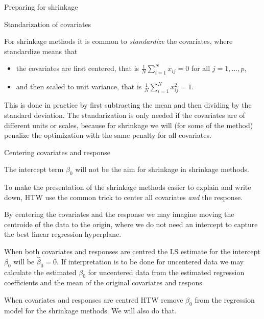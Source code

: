 \documentclass[
  ignorenonframetext,
]{beamer}
\providecommand{\tightlist}{%
  \setlength{\itemsep}{0pt}\setlength{\parskip}{0pt}}
\begin{document}
\begin{frame}

\begin{block}{Preparing for shrinkage}

\begin{block}{Standarization of covariates}

For shrinkage methods it is common to \emph{standardize} the covariates,
where standardize means that

\begin{itemize}
\tightlist
\item
  the covariates are first centered, that is
  \(\frac{1}{N}\sum_{i=1}^N x_{ij}=0\) for all \(j=1,\ldots, p\),
\item
  and then scaled to unit variance, that is
  \(\frac{1}{N}\sum_{i=1}^N x^2_{ij}=1\).
\end{itemize}

This is done in practice by first subtracting the mean and then dividing
by the standard deviation. The standarization is only needed if the
covariates are of different units or scales, because for shrinkage we
will (for some of the method) penalize the optimization with the same
penalty for all covariates.

\end{block}

\end{block}

\end{frame}

\begin{frame}

\begin{block}{Centering covariates and response}

The intercept term \(\beta_0\) will not be the aim for shrinkage in
shrinkage methods.

To make the presentation of the shrinkage methods easier to explain and
write down, HTW use the common trick to center all covariates \emph{and}
the response.

By centering the covariates and the response we may imagine moving the
centroide of the data to the origin, where we do not need an intercept
to capture the best linear regression hyperplane.

When both covariates and responses are centred the LS estimate for the
intercept \(\beta_0\) will be \(\hat{\beta}_0=0\). If interpretation is
to be done for uncentered data we may calculate the estimated
\(\beta_0\) for uncentered data from the estimated regression
coefficients and the mean of the original covariates and respons.

When covariates and responses are centred HTW remove \(\beta_0\) from
the regression model for the shrinkage methods. We will also do that.

\end{block}

\end{frame}
\end{document}
